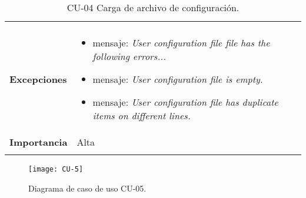 \begin{longtable}[H]{@{}ll@{}}
\begin{minipage}[t]{0.71\columnwidth}
\end{minipage}\tabularnewline
\begin{minipage}[t]{0.23\columnwidth}\raggedright\strut
\textbf{Excepciones}\strut
\end{minipage} & \begin{minipage}[t]{0.71\columnwidth}\raggedright\strut
\begin{itemize}
\tightlist
\item
  mensaje: \textit{User configuration file file has the following errors...}
\item
  mensaje: \textit{User configuration file is empty.}
\item
  mensaje: \textit{User configuration file has duplicate items on different lines.}  

  
\end{itemize}\strut
\end{minipage}\tabularnewline
\begin{minipage}[t]{0.23\columnwidth}\raggedright\strut
\textbf{Importancia}\strut
\end{minipage} & \begin{minipage}[t]{0.71\columnwidth}\raggedright\strut
Alta\strut
\end{minipage}\tabularnewline
\bottomrule
\caption{CU-04 Carga de archivo de configuración.}
\end{longtable}

\begin{figure}[H]
	\centering
	\texttt{[image: CU-5]}
	\caption{Diagrama de caso de uso CU-05.}
	\label{fig:CU-5}
\end{figure}


